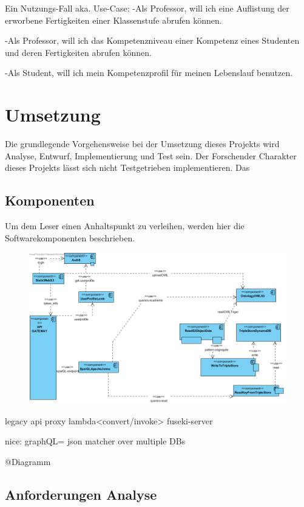\documentclass[
12pt,
english,
ngerman,
headsepline,
twoside,
openright,
numbers=noenddot,version=first
]{scrreprt}
\begin{document}
Ein Nutzungs-Fall aka. Use-Case:
-Als Professor, will ich eine Auflistung der erworbene Fertigkeiten einer Klassenstufe abrufen können.

-Als Professor, will ich das Kompetenzniveau einer Kompetenz eines Studenten und deren Fertigkeiten abrufen können.

-Als Student, will ich mein Kompetenzprofil für meinen Lebenslauf benutzen.

\chapter{Umsetzung}
Die grundlegende Vorgehensweise bei der Umsetzung dieses Projekts wird Analyse, Entwurf, Implementierung und Test sein. Der Forschender Charakter dieses Projekts lässt sich nicht Testgetrieben implementieren.
Das

\section{Komponenten}

Um dem Leser einen Anhaltspunkt zu verleihen, werden hier die Softwarekomponenten beschrieben.

\begin{figure}[H]
\includegraphics[width=\linewidth]{pics/arch-comp.png}
\end{figure}

legacy api proxy\cite{sbarski2017serverless}
lambda<convert/invoke> fuseki-server\label{komponenten:fuseki}

nice: graphQL= json matcher over multiple DBs

@Diagramm

\section{Anforderungen Analyse}
\end{document}
